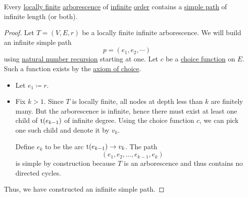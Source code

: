\begin{theorem}\label{thm:konigs_lemma}
  Every \hyperref[def:graph_incidence/degree]{locally finite} \hyperref[def:arborescence]{arborescence} of \hyperref[def:graph/order]{infinite} \hyperref[def:graph/order]{order} contains a \hyperref[def:graph_adjancency_chain/simple]{simple path} of infinite length (or both).
\end{theorem}
\begin{proof}
  Let \( T = (V, E, r) \) be a locally finite infinite arborescence. We will build an infinite simple path
  \begin{equation*}
    p = (e_1, e_2, \cdots)
  \end{equation*}
  using \hyperref[rem:natural_number_recursion]{natural number recursion} starting at one. Let \( c \) be a \hyperref[def:choice_function]{choice function} on \( E \). Such a function exists by the \hyperref[def:zfc/choice]{axiom of choice}.
  \begin{itemize}
    \item Let \( e_1 \coloneqq r \).
    \item Fix \( k > 1 \). Since \( T \) is locally finite, all nodes at depth less than \( k \) are finitely many. But the arborescence is infinite, hence there must exist at least one child of \( \operatorname{t}(e_{k-1}) \) of infinite degree. Using the choice function \( c \), we can pick one such child and denote it by \( v_k \).

    Define \( e_k \) to be the arc \( \operatorname{t}(e_{k-1}) \to v_k \). The path
    \begin{equation*}
      (e_1, e_2, \ldots, e_{k-1}, e_k)
    \end{equation*}
    is simple by construction because \( T \) is an arborescence and thus contains no directed cycles.
  \end{itemize}

  Thus, we have constructed an infinite simple path.
\end{proof}
